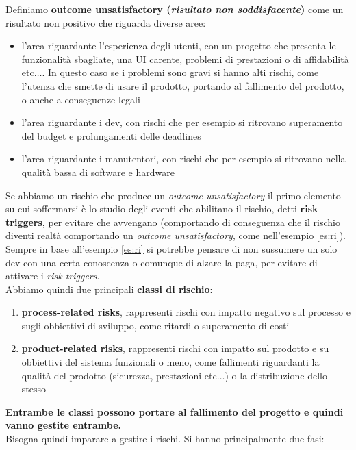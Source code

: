 \documentclass[a4paper,12pt, oneside]{book}
\begin{document}
\begin{definizione}
  Definiamo \textbf{outcome unsatisfactory (\textit{risultato non
      soddisfacente})} come un risultato non positivo che riguarda diverse aree:
  \begin{itemize}
    \item l'area riguardante l'esperienza degli utenti, con un progetto che
    presenta le funzionalità sbagliate, una UI carente, problemi di prestazioni
    o di affidabilità etc$\ldots$. In questo caso se i problemi sono gravi si
    hanno alti rischi, come l'utenza che smette di usare il prodotto, portando
    al fallimento del prodotto, o anche a conseguenze legali
    \item l'area riguardante i dev, con rischi che per esempio si ritrovano
    superamento del budget e prolungamenti delle deadlines
    \item l'area riguardante i manutentori, con rischi che per esempio si
    ritrovano nella qualità bassa di software e hardware
  \end{itemize}
\end{definizione}
Se abbiamo un rischio che produce un \textit{outcome unsatisfactory} il primo
elemento su cui soffermarsi è lo studio degli eventi che abilitano il rischio,
detti \textbf{risk triggers}, per evitare che avvengano (comportando di
conseguenza che il rischio diventi realtà comportando un \textit{outcome
  unsatisfactory}, come nell'esempio \ref{es:ri}). Sempre in base all'esempio
\ref{es:ri} si potrebbe pensare di non sussumere un solo dev con una certa
conoscenza o comunque di alzare la paga, per evitare di attivare i \textit{risk
  triggers}.\\
Abbiamo quindi due principali \textbf{classi di rischio}:
\begin{enumerate}
  \item \textbf{process-related risks}, rappresenti rischi con impatto negativo
  sul processo e sugli obbiettivi di sviluppo, come ritardi o superamento di
  costi 
  \item \textbf{product-related risks}, rappresenti rischi con impatto sul
  prodotto e su obbiettivi del sistema funzionali o meno, come fallimenti
  riguardanti la qualità del prodotto (sicurezza, prestazioni etc$\ldots$) o la
  distribuzione dello stesso 
\end{enumerate}
\textbf{Entrambe le classi possono portare al fallimento del progetto e quindi
  vanno gestite entrambe.}\\
Bisogna quindi imparare a gestire i rischi. Si hanno principalmente due fasi:
\end{document}
